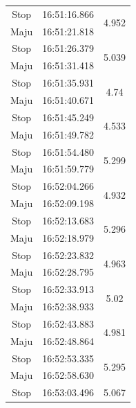 \begin{longtable}{|c|c|c|}
  Stop           & 16:51:16.866        & \multirow{2}{*}{4.952}  \\ \cline{1-2}
  Maju           & 16:51:21.818        &                         \\ \hline
  Stop           & 16:51:26.379        & \multirow{2}{*}{5.039}  \\ \cline{1-2}
  Maju           & 16:51:31.418        &                         \\ \hline
  Stop           & 16:51:35.931        & \multirow{2}{*}{4.74}   \\ \cline{1-2}
  Maju           & 16:51:40.671        &                         \\ \hline
  Stop           & 16:51:45.249        & \multirow{2}{*}{4.533}  \\ \cline{1-2}
  Maju           & 16:51:49.782        &                         \\ \hline
  Stop           & 16:51:54.480        & \multirow{2}{*}{5.299}  \\ \cline{1-2}
  Maju           & 16:51:59.779        &                         \\ \hline
  Stop           & 16:52:04.266        & \multirow{2}{*}{4.932}  \\ \cline{1-2}
  Maju           & 16:52:09.198        &                         \\ \hline
  Stop           & 16:52:13.683        & \multirow{2}{*}{5.296}  \\ \cline{1-2}
  Maju           & 16:52:18.979        &                         \\ \hline
  Stop           & 16:52:23.832        & \multirow{2}{*}{4.963}  \\ \cline{1-2}
  Maju           & 16:52:28.795        &                         \\ \hline
  Stop           & 16:52:33.913        & \multirow{2}{*}{5.02}   \\ \cline{1-2}
  Maju           & 16:52:38.933        &                         \\ \hline
  Stop           & 16:52:43.883        & \multirow{2}{*}{4.981}  \\ \cline{1-2}
  Maju           & 16:52:48.864        &                         \\ \hline
  Stop           & 16:52:53.335        & \multirow{2}{*}{5.295}  \\ \cline{1-2}
  Maju           & 16:52:58.630        &                         \\ \hline
  Stop           & 16:53:03.496        & \multirow{2}{*}{5.067}  \\ \cline{1-2}

\end{longtable}
